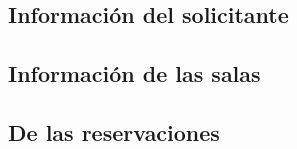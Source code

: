\subsection{Información del solicitante}

\subsection{Información de las salas}

\subsection{De las reservaciones}
